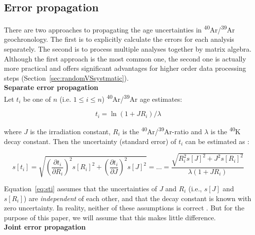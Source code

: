 \documentclass{article}
\begin{document}
\setcounter{section}{3}
\setcounter{subsection}{1}
\subsection{Error propagation}
\label{sec:errorpropagation}

There are two approaches to propagating the age uncertainties in
\textsuperscript{40}Ar/\textsuperscript{39}Ar geochronology.  The
first is to explicitly calculate the errors for each analysis
separately. The second is to process multiple analyses together by
matrix algebra. Although the first approach is the most common one,
the second one is actually more practical and offers significant
advantages for higher order data processing steps
(Section~\ref{sec:randomVSsystmatic}).\\

\noindent\textbf{Separate error propagation}\\

Let $t_i$ be one of $n$ (i.e. $1 \leq i \leq n$)
\textsuperscript{40}Ar/\textsuperscript{39}Ar age estimates:

\begin{equation}
  t_i = \ln\left(1 + J R_i\right)/\lambda
  \label{eq:ti}
\end{equation}

\noindent where $J$ is the irradiation constant, $R_i$ is the
\textsuperscript{40}Ar/\textsuperscript{39}Ar-ratio and $\lambda$ is
the \textsuperscript{40}K decay constant. Then the uncertainty
(standard error) of $t_i$ can be estimated as \citep{mcdougall1999}:

\begin{equation}
  s[t_i] = \sqrt{\left(\frac{\partial t_i}{\partial R_i}\right)^2 s[R_i]^2 +
  \left(\frac{\partial t_i}{\partial J}\right)^2 s[J]^2} = \ldots =
  \frac{\sqrt{R_i^2 s[J]^2 + J^2 s[R_i]^2}}{\lambda (1 + J R_i)}
  \label{eq:sti}
\end{equation}

Equation~\ref{eq:sti} assumes that the uncertainties of $J$ and $R_i$
(i.e., $s[J]$ and $s[R_i]$) are \emph{independent} of each other, and
that the decay constant is known with zero uncertainty. In reality,
neither of these assumptions is correct \citep{vermeesch2015b}.  But
for the purpose of this paper, we will assume that this makes little
difference.\\

\noindent\textbf{Joint error propagation}\\
\end{document}
